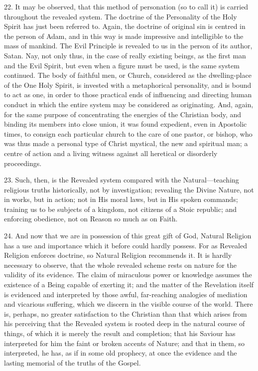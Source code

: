 22. It may be observed, that this method of personation (so to call
it) is carried throughout the revealed system. The doctrine of the
Personality of the Holy Spirit has just been referred to. Again, the
doctrine of original sin is centred in the person of Adam, and in this
way is made impressive and intelligible to the mass of mankind. The
Evil Principle is revealed to us in the person of its author, Satan.
Nay, not only thus, in the case of really existing beings, as the
first man and the Evil Spirit, but even when a figure must be used, is
the same system continued. The body of faithful men, or Church,
considered as the dwelling-place of the One Holy Spirit, is invested
with a metaphorical personality, and is bound to act as one, in order
to those practical ends of influencing and directing human conduct in
which the entire system may be considered as originating. And, again,
for the same purpose of concentrating the energies of the Christian
body, and binding its members into close union, it was found
expedient, even in Apostolic times, to consign each particular church
to the care of one pastor, or bishop, who was thus made a personal
type of Christ mystical, the new and spiritual man; a centre of action
and a living witness against all heretical or disorderly proceedings.

23. Such, then, is the Revealed system compared with the Natural—teaching
religious truths historically, not by investigation; revealing the
Divine Nature, not in works, but in action; not in His moral laws, but
in His spoken commands; training us to be subjects of a kingdom, not
citizens of a Stoic republic; and enforcing obedience, not on Reason
so much as on Faith.

24. And now that we are in possession of this great gift of God,
Natural Religion has a use and importance which it before could hardly
possess. For as Revealed Religion enforces doctrine, so Natural
Religion recommends it. It is hardly necessary to observe, that the
whole revealed scheme rests on nature for the validity of its
evidence. The claim of miraculous power or knowledge assumes the
existence of a Being capable of exerting it; and the matter of the
Revelation itself is evidenced and interpreted by those awful,
far-reaching analogies of mediation and vicarious suffering, which we
discern in the visible course of the world. There is, perhaps, no
greater satisfaction to the Christian than that which arises from his
perceiving that the Revealed system is rooted deep in the natural
course of things, of which it is merely the result and completion;
that his Saviour has interpreted for him the faint or broken accents
of Nature; and that in them, so interpreted, he has, as if in some old
prophecy, at once the evidence and the lasting memorial of the truths
of the Gospel.

